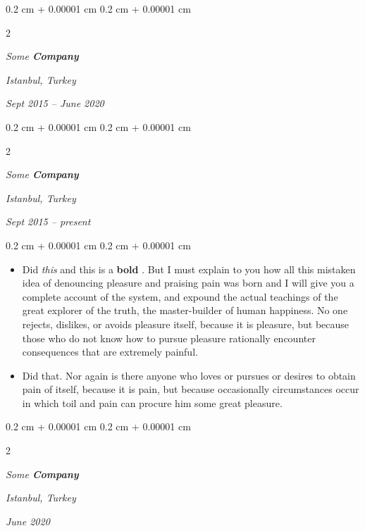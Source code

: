 \documentclass[10pt, letterpaper]{article}
\newenvironment{highlights}{
    \begin{itemize}[
        topsep=0.10 cm,
        parsep=0.10 cm,
        partopsep=0pt,
        itemsep=0pt,
        leftmargin=0.4 cm + 10pt
    ]
}{
    \end{itemize}
} %
\newenvironment{onecolentry}{
    \begin{adjustwidth}{
        0.2 cm + 0.00001 cm
    }{
        0.2 cm + 0.00001 cm
    }
}{
    \end{adjustwidth}
} %
\newenvironment{twocolentry}[2][]{
    \onecolentry
    \def\secondColumn{#2}
    \setcolumnwidth{\fill, 4.5 cm}
    \begin{paracol}{2}
}{
    \switchcolumn \raggedleft \secondColumn
    \end{paracol}
    \endonecolentry
} %
\let\hrefWithoutArrow\href
\renewcommand{\href}[2]{\hrefWithoutArrow{#1}{\ifthenelse{\equal{#2}{}}{ }{#2 }\raisebox{.15ex}{\footnotesize \faExternalLink*}}}
\begin{document}
        \vspace{0.2 cm}

            \begin{twocolentry}{
        \textit{Istanbul, Turkey}

        \textit{Sept 2015 – June 2020}    }
                \textbf{}

                \textit{Some \textbf{Company}}
            \end{twocolentry}



        \vspace{0.2 cm}

            \begin{twocolentry}{
        \textit{Istanbul, Turkey}

        \textit{Sept 2015 – present}    }
                \textbf{}

                \textit{Some \textbf{Company}}
            \end{twocolentry}

        \vspace{0.10 cm}
        \begin{onecolentry}
            \begin{highlights}
                \item Did \textit{this} and this is a \textbf{bold} \href{https://example.com}{link}. But I must explain to you how all this mistaken idea of denouncing pleasure and praising pain was born and I will give you a complete account of the system, and expound the actual teachings of the great explorer of the truth, the master-builder of human happiness. No one rejects, dislikes, or avoids pleasure itself, because it is pleasure, but because those who do not know how to pursue pleasure rationally encounter consequences that are extremely painful.
                \item Did that. Nor again is there anyone who loves or pursues or desires to obtain pain of itself, because it is pain, but because occasionally circumstances occur in which toil and pain can procure him some great pleasure.
            \end{highlights}
        \end{onecolentry}


        \vspace{0.2 cm}

            \begin{twocolentry}{
        \textit{Istanbul, Turkey}

        \textit{June 2020}    }
                \textbf{}

                \textit{Some \textbf{Company}}
            \end{twocolentry}
\end{document}
